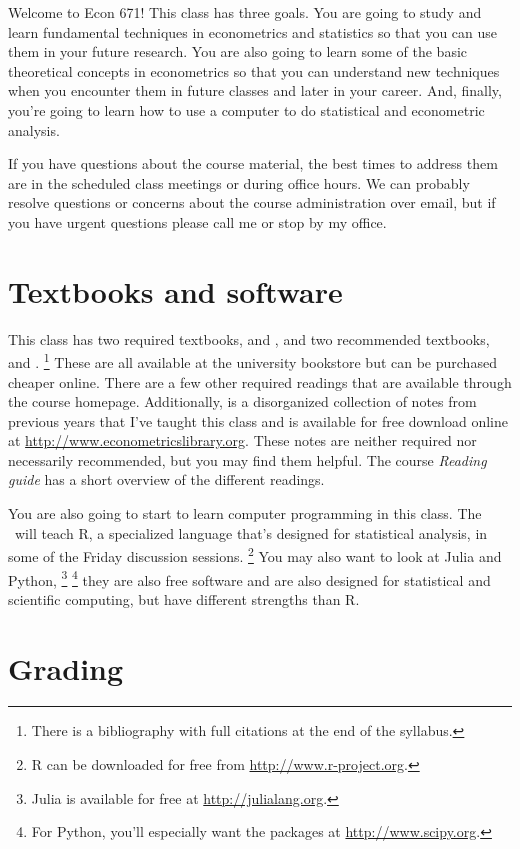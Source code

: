\noindent%
Welcome to Econ 671! This class has three goals. You are going to
study and learn fundamental techniques in econometrics and statistics
so that you can use them in your future research.  You are also going
to learn some of the basic theoretical concepts in econometrics so
that you can understand new techniques when you encounter them in
future classes and later in your career.  And, finally, you're going
to learn how to use a computer to do statistical and econometric
analysis.

If you have questions about the course material, the best times to
address them are in the scheduled class meetings or during office
hours. We can probably resolve questions or concerns about the course
administration over email, but if you have urgent questions please
call me or stop by my office.

\section{Textbooks and software}

This class has two required textbooks, \citep{CB02} and \citep{Gr12},
and two recommended textbooks, \citep{Ga97} and \citep{Fr09}.%
\footnote{There is a bibliography with full citations at the end of the
  syllabus.} %
These are all available at the university bookstore but can be
purchased cheaper online. There are a few other required readings that
are available through the course homepage. Additionally,
\citep{eflp-core} is a disorganized collection of notes from previous
years that I've taught this class and is available for free download
online at \url{http://www.econometricslibrary.org}. These notes are
neither required nor necessarily recommended, but you may find them
helpful.  The course \emph{Reading guide} has a short overview of the
different readings.

You are also going to start to learn computer programming in this
class. The \TA\ will teach R, a specialized language that's designed
for statistical analysis, in some of the Friday discussion sessions.%
\footnote{R can be downloaded for free from
  \url{http://www.r-project.org}.} %
You may also want to look at Julia and Python,%
\footnote{Julia is available for free at \url{http://julialang.org}.}%
\footnote{For Python, you'll especially want the packages at
  \url{http://www.scipy.org}.} %
they are also free software and are also designed for statistical and
scientific computing, but have different strengths than R.

\section{Grading}

